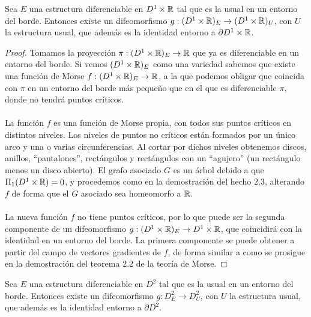 \begin{hecho}
	Sea $E$ una estructura diferenciable en $D^1 \times \mathbb{R}$ tal que es la usual en un entorno del borde. Entonces existe un difeomorfismo $g:(D^1 \times \mathbb{R})_E \rightarrow (D^1 \times \mathbb{R})_U$, con $U$ la estructura usual, que además es la identidad entorno a $\partial D^1 \times \mathbb{R}$.
\end{hecho}

\begin{proof}
	Tomamos la proyección $\pi : (D^1 \times \mathbb{R})_E \rightarrow \mathbb{R}$ que ya es diferenciable en un entorno del borde. Si vemos $(D^1 \times \mathbb{R})_{E}$ como una variedad sabemos que existe una  función de Morse $f : (D^1 \times \mathbb{R})_E \rightarrow \mathbb{R}$, a la que podemos obligar que coincida con $\pi$ en un entorno del borde más pequeño que en el que es diferenciable $\pi$, donde no tendrá puntos críticos. \\
	\\ La función $f$ es una función de Morse propia, con todos sus puntos críticos en distintos niveles. Los niveles de puntos no críticos están formados por un único arco y una o varias circunferencias. Al cortar por dichos niveles obtenemos discos, anillos, ``pantalones'', rectángulos y rectángulos con un ``agujero'' (un rectángulo menos un disco abierto). El grafo asociado $G$ es un árbol debido a que $\Pi_1(D^1 \times \mathbb{R}) = 0$, y procedemos como en la demostración del hecho $2.3$, alterando $f$ de forma que el $G$ asociado sea homeomorfo a $\mathbb{R}$. \\
	\\ La nueva función $f$ no tiene puntos críticos, por lo que puede ser la segunda componente de un difeomorfismo $g:(D^1 \times \mathbb{R})_E \rightarrow D^1 \times \mathbb{R}$, que coincidirá con la identidad en un entorno del borde. La primera componente se puede obtener a partir del campo de vectores gradientes de $f$, de forma similar a como se prosigue en la demostración del teorema $2.2$ de la teoría de Morse.
\end{proof}

\begin{hecho}
	Sea $E$ una estructura diferenciable en $D^2$ tal que es la usual en un entorno del borde. Entonces existe un difeomorfismo $g:D^2_E \rightarrow D^2_U$, con $U$ la estructura usual, que además es la identidad entorno a $\partial D^2$.
\end{hecho}

